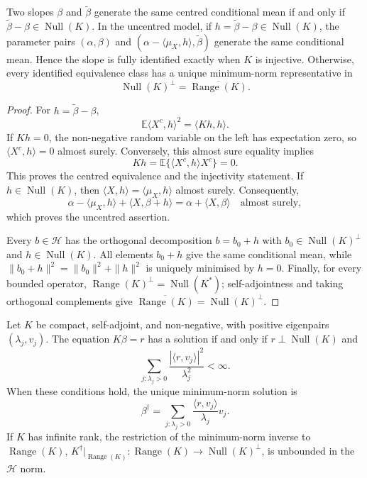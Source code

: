 \begin{proposition}
\label{prop:app-identification}
Two slopes $\beta$ and $\widetilde\beta$ generate the same centred
conditional mean if and only if
$\widetilde\beta-\beta\in\operatorname{Null}(K)$.  In the uncentred model,
if $h=\widetilde\beta-\beta\in\operatorname{Null}(K)$, the parameter pairs
$(\alpha,\beta)$ and
$(\alpha-\langle\mu_X,h\rangle,\widetilde\beta)$ generate the same
conditional mean.  Hence the slope is fully identified exactly when $K$ is
injective.  Otherwise, every identified equivalence class has a unique
minimum-norm representative in
\[
 \operatorname{Null}(K)^\perp
 =\overline{\operatorname{Range}(K)}.
\]
\end{proposition}

\begin{proof}
For $h=\widetilde\beta-\beta$,
\[
 \mathbb E\langle X^c,h\rangle^2=\langle Kh,h\rangle.
\]
If $Kh=0$, the non-negative random variable on the left has expectation
zero, so $\langle X^c,h\rangle=0$ almost surely.  Conversely, this almost
sure equality implies
\[
    Kh=\mathbb E\{\langle X^c,h\rangle X^c\}=0.
\]
This proves the centred equivalence and the injectivity statement.  If
$h\in\operatorname{Null}(K)$, then
$\langle X,h\rangle=\langle\mu_X,h\rangle$ almost surely.  Consequently,
\[
 \alpha-\langle\mu_X,h\rangle
 +\langle X,\beta+h\rangle
 =\alpha+\langle X,\beta\rangle
 \quad\text{almost surely},
\]
which proves the uncentred assertion.

Every $b\in\mathcal H$ has the orthogonal decomposition
$b=b_0+h$ with $b_0\in\operatorname{Null}(K)^\perp$ and
$h\in\operatorname{Null}(K)$.  All elements $b_0+h$ give the same
conditional mean, while
$\|b_0+h\|^2=\|b_0\|^2+\|h\|^2$ is uniquely minimised by $h=0$.  Finally,
for every bounded operator,
$\operatorname{Range}(K)^\perp=\operatorname{Null}(K^*)$; self-adjointness
and taking orthogonal complements give
$\overline{\operatorname{Range}(K)}=\operatorname{Null}(K)^\perp$.
\end{proof}

\begin{theorem}
\label{thm:app-picard}
Let $K$ be compact, self-adjoint, and non-negative, with positive eigenpairs
$(\lambda_j,v_j)$.  The equation $K\beta=r$ has a solution if and only if
$r\perp\operatorname{Null}(K)$ and
\[
    \sum_{j:\lambda_j>0}
       \frac{|\langle r,v_j\rangle|^2}{\lambda_j^2}<\infty.
\]
When these conditions hold, the unique minimum-norm solution is
\[
 \beta^\dagger
 =\sum_{j:\lambda_j>0}
   \frac{\langle r,v_j\rangle}{\lambda_j}v_j.
\]
If $K$ has infinite rank, the restriction of the minimum-norm inverse to
$\operatorname{Range}(K)$,
$K^\dagger|_{\operatorname{Range}(K)}:\operatorname{Range}(K)
\to\operatorname{Null}(K)^\perp$, is unbounded in the $\mathcal H$ norm.
\end{theorem}

